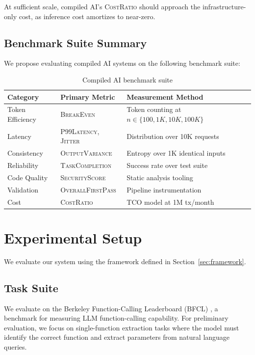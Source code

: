 \documentclass[11pt]{article}
\newcommand{\metric}[1]{\textsc{#1}}
\begin{document}
At sufficient scale, compiled AI's \metric{CostRatio} should approach the infrastructure-only cost, as inference cost amortizes to near-zero.

\subsection{Benchmark Suite Summary}

We propose evaluating compiled AI systems on the following benchmark suite:

\begin{table}[ht]
\centering
\caption{Compiled AI benchmark suite}
\label{tab:benchmark-suite}
\begin{tabular}{p{3cm}p{4cm}p{5cm}}
\toprule
Category & Primary Metric & Measurement Method \\
\midrule
Token Efficiency & \metric{BreakEven} & Token counting at $n \in \{100, 1K, 10K, 100K\}$ \\
Latency & \metric{P99Latency}, \metric{Jitter} & Distribution over 10K requests \\
Consistency & \metric{OutputVariance} & Entropy over 1K identical inputs \\
Reliability & \metric{TaskCompletion} & Success rate over test suite \\
Code Quality & \metric{SecurityScore} & Static analysis tooling \\
Validation & \metric{OverallFirstPass} & Pipeline instrumentation \\
Cost & \metric{CostRatio} & TCO model at 1M tx/month \\
\bottomrule
\end{tabular}
\end{table}

\section{Experimental Setup}
\label{sec:experiments}

We evaluate our system using the framework defined in Section~\ref{sec:framework}.

\subsection{Task Suite}

We evaluate on the Berkeley Function-Calling Leaderboard (BFCL) \citep{patil2024gorilla}, a benchmark for measuring LLM function-calling capability. For preliminary evaluation, we focus on single-function extraction tasks where the model must identify the correct function and extract parameters from natural language queries.
\end{document}
